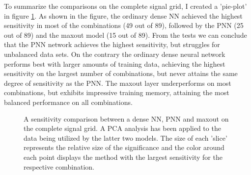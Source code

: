 To summarize the comparisons on the complete signal grid, I created a 'pie-plot' in figure \ref{fig:FSComp}. As shown in the figure, the ordinary dense \ac{NN}
achieved the highest sensitivity in most of the combinations (49 out of 89), followed by the \ac{PNN} (25 out of 89) and the maxout model (15 out of 89). From the tests we can conclude that 
the \ac{PNN} network achieves the highest sensitivity, but struggles for unbalanced data sets. On the contrary the ordinary dense neural network performs best with larger amounts of 
training data, achieving the highest sensitivity on the largest number of combinations, but never attains the same degree of sensitivity as the \ac{PNN}. The maxout layer underperforms on 
most combinations, but exhibits impressive training memory, attaining the most balanced performance on all combinations.
\begin{figure}
    \caption[A sensitivity comparison between a dense \acs{NN}, \acs{PNN} and maxout on the complete signal grid.
    A \acs{PCA} analysis has been applied to the data being utilized by the latter two models.]{
    A sensitivity comparison between a dense \ac{NN}, \ac{PNN} and maxout on the complete signal grid. 
    A \ac{PCA} analysis has been applied to the data being utilized by the latter two models.
    The size of each 'slice' represents the relative size of the significance and the color around each point 
    displays the method with the largest sensitivity for the respective combination.}
    \label{fig:FSComp}
\end{figure}